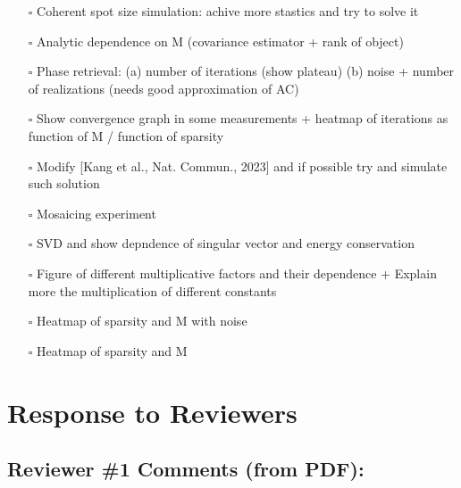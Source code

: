 \documentclass[12pt]{article}
\begin{document}
\begin{itemize}

\item[$\square$]
Coherent spot size simulation: achive more stastics and try to solve it
\item[$\square$]
Analytic dependence on M (covariance estimator + rank of object) 

\item[$\square$]
Phase retrieval: (a) number of iterations (show plateau) (b) noise + number of realizations (needs good approximation of AC)
\item[$\square$]
Show convergence graph in some measurements + heatmap of iterations as function of M / function of sparsity
\item[$\square$]
Modify [Kang et al., Nat. Commun., 2023] and if possible try and simulate such solution

\item[$\square$]
Mosaicing experiment

\item[$\square$]
SVD and show depndence of singular vector and energy conservation

\item[$\square$]
Figure of different multiplicative factors and their dependence + Explain more the multiplication of different constants 

\item[$\square$]
Heatmap of sparsity and M with noise
\item[\rlap{\raisebox{0.3ex}{\hspace{0.4ex}\scriptsize \ding{51}}}$\square$]
Heatmap of sparsity and M

\end{itemize}
\newpage
\section*{Response to Reviewers}

\subsection*{Reviewer \#1 Comments (from PDF):}
\end{document}
